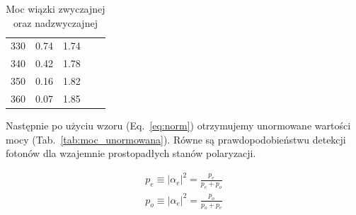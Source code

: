 \documentclass[quantumrep,article,accept,oneauthor,pdftex]{Definitions/mdpi}
\begin{document}
\begin{table}[H]
\begin{tabular}{ccccc}
330                                   & 0.74                                 & 1.74                              \\
340                                   & 0.42                                 & 1.78                              \\
350                                   & 0.16                                 & 1.82                              \\
360                                   & 0.07                                 & 1.85                             \\
\bottomrule
\end{tabular}
\caption{Moc wiązki zwyczajnej oraz nadzwyczajnej}%
\label{tab:moc}
\end{table}

Następnie po użyciu wzoru (Eq.~\ref{eq:norm}) otrzymujemy unormowane wartości mocy (Tab.~\ref{tab:moc_unormowana}).
Równe są prawdopodobieństwu detekcji fotonów dla wzajemnie prostopadłych stanów
polaryzacji.

\begin{equation}
\begin{aligned}
p_e \equiv \left| \alpha_e \right|^2 = \frac{p_e}{p_e + p_o} \\
p_o \equiv \left| \alpha_e \right|^2 = \frac{p_o}{p_o + p_e}
\end{aligned}%
\label{eq:norm}
\end{equation}
\end{document}
